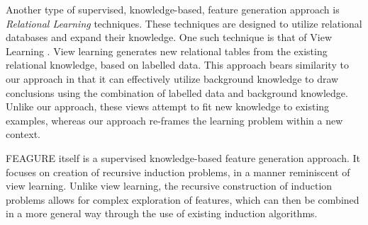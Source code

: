 \documentclass[twoside,11pt]{article}
\theoremstyle{definition}
\begin{document}
Another type of supervised, knowledge-based, feature generation approach is \emph{Relational Learning} techniques. These techniques are designed to utilize relational databases and expand their knowledge. One such technique is that of View Learning \cite{davis2005view}. View learning generates new relational tables from the existing relational knowledge, based on labelled data.
This approach bears similarity to our approach in that it can effectively utilize background knowledge to draw conclusions using the combination of labelled data and background knowledge. Unlike our approach, these views attempt to fit new knowledge to existing examples, whereas our approach re-frames the learning problem within a new context.

FEAGURE itself is a supervised knowledge-based feature generation approach. It focuses on creation of recursive induction problems, in a manner reminiscent of view learning. Unlike view learning, the recursive construction of induction problems allows for complex exploration of features, which can then be combined in a more general way through the use of existing induction algorithms.


 
\end{document}
